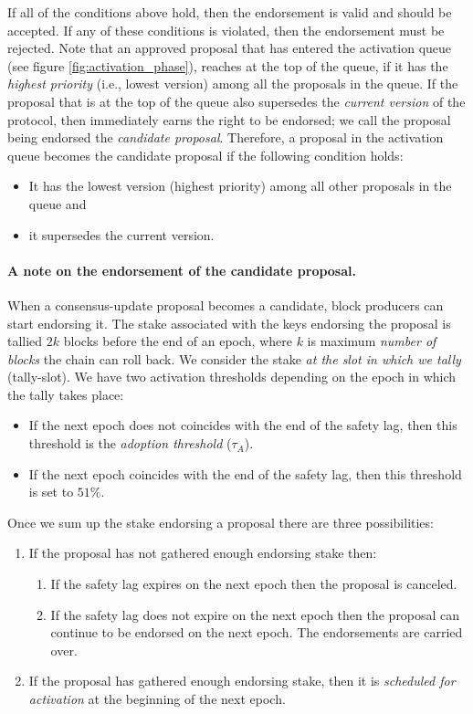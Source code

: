 If all of the conditions above hold, then the endorsement is valid and should be
accepted. If any of these conditions is violated, then the endorsement must be
rejected. Note that an approved proposal that has entered the activation queue
(see figure \ref{fig:activation_phase}), reaches at the top of the queue, if it
has the \emph{highest priority} (i.e., lowest version) among all the proposals
in the queue. If the proposal that is at the top of the queue also supersedes
the \emph{current version} of the protocol, then immediately earns the right to
be endorsed; we call the proposal being endorsed the \emph{candidate proposal}.
Therefore, a proposal in the activation queue becomes the candidate proposal if
the following condition holds:

\begin{itemize}
	\item It has the lowest version (highest priority) among all other
	proposals in the queue and
	\item it supersedes the current version.
\end{itemize}

\paragraph{A note on the endorsement of the candidate proposal.}
When a consensus-update proposal becomes a candidate, block producers can start
endorsing it. The stake associated with the keys endorsing the proposal is
tallied $2k$ blocks before the end of an epoch, where $k$ is maximum
\emph{number of blocks} the chain can roll back. We consider the stake
\emph{at the slot in which we tally} (tally-slot). We have two activation 
thresholds
depending on the epoch in which the tally takes place:
\begin{itemize}
	\item If the next epoch does not coincides with the end of the safety lag,
	then
	this threshold is the \emph{adoption threshold} ($\tau_A$).
	\item If the next epoch coincides with the end of the safety lag, then this
	threshold is set to $51\%$.
\end{itemize}

Once we sum up the stake endorsing a proposal there are three possibilities:
\begin{enumerate}
	\item If the proposal has not gathered enough endorsing stake then:
	\begin{enumerate}
		\item If the safety lag expires on the next epoch then the proposal is
		canceled.
		\item If the safety lag does not expire on the next epoch then the
		proposal
		can continue to be endorsed on the next epoch. The endorsements are
		carried
		over.
	\end{enumerate}
	\item If the proposal has gathered enough endorsing stake, then it is
	\emph{scheduled for activation} at the beginning of the next epoch.
\end{enumerate}

